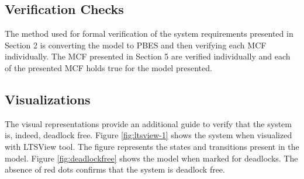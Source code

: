 \documentclass[a4paper,12pt]{article}
\begin{document}
\subsection{Verification Checks}
The method used for formal verification of the system requirements presented in Section 2 is converting the model to PBES and then verifying each MCF individually. The MCF presented in Section 5 are verified individually and each of the presented MCF holds true for the model presented.
\subsection{Visualizations}
The visual representations provide an additional guide to verify that the system is, indeed, deadlock free. Figure \ref{fig:ltsview-1} shows the system when visualized with LTSView tool. The figure represents the states and transitions present in the model. Figure \ref{fig:deadlockfree} shows the model when marked for deadlocks. The absence of red dots confirms that the system is deadlock free.
\end{document}

